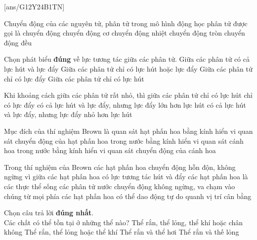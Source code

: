 [ans/G12Y24B1TN]
\begin{ex}
Chuyển động của các nguyên tử, phân tử trong mô hình động học phân tử được gọi là chuyển động
\choice
{chuyển động cơ}
{\True chuyển động nhiệt}
{chuyển động tròn}
{chuyển động đều}
\loigiai{ }
\end{ex}

\begin{ex}

Chọn phát biểu \textbf{đúng} về lực tương tác giữa các phân tử.
\choice
{\True Giữa các phân tử có cả lực hút và lực đẩy}
{ Giữa các phân tử chỉ có lực hút hoặc lực đẩy}
{ Giữa các phân tử chỉ có lực đẩy}
{ Giữa các phân tử chỉ có lực hút}
\loigiai{ }
\end{ex}

\begin{ex}
Khi khoảng cách giữa các phân tử rất nhỏ, thì giữa các phân tử
\choice
{ chỉ có lực hút}
{ chỉ có lực đẩy}
{\True có cả lực hút và lực đẩy, nhưng lực đẩy lớn hơn lực hút}
{ có cả lực hút và lực đẩy, nhưng lực đẩy nhỏ hơn lực hút}
\loigiai{ }
\end{ex}


\begin{ex}
Mục đích của thí nghiệm Brown là
\choice
{ quan sát hạt phấn hoa bằng kính hiển vi}
{\True quan sát chuyển động của hạt phấn hoa trong nước bằng kính hiển vi}
{ quan sát cánh hoa trong nước bằng kính hiển vi}
{ quan sát chuyển động của cánh hoa}
\loigiai{ }
\end{ex}


\begin{ex} 
Trong thí nghiệm của Brown các hạt phấn hoa chuyển động hỗn độn, không ngừng vì
\choice
{ giữa các hạt phấn hoa có lực tương tác hút và đẩy}
{ các hạt phấn hoa là các thực thể sống}
{\True các phân tử nước chuyển động không ngừng, va chạm vào chúng từ mọi phía}
{ các hạt phấn hoa có thể dao động tự do quanh vị trí cân bằng}
\loigiai{ }
\end{ex}


\begin{ex}
Chọn câu trả lời \textbf{đúng nhất}. \\
Các chất có thể tồn tại ở những thể nào?
\choice
{ Thể rắn, thể lỏng, thể khí hoặc chân không}
{\True Thể rắn, thể lỏng hoặc thể khí}
{ Thể rắn và thể hơi}
{ Thể rắn và thế lỏng}
\loigiai{ }
\end{ex}


